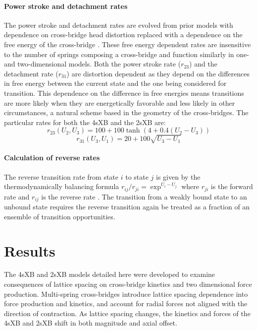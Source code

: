 \documentclass[]{article}
\begin{document}
\paragraph{Power stroke and detachment rates} %
The power stroke and detachment rates are evolved from prior models with dependence on cross-bridge head distortion replaced with a dependence on the free energy of the cross-bridge \citep{Pate1989, Tanner2007}.
These free energy dependent rates are insensitive to the number of springs composing a cross-bridge and function similarly in one- and two-dimensional models. 
Both the power stroke rate ($r_{23}$) and the detachment rate ($r_{31}$) are distortion dependent as they depend on the differences in free energy between the current state and the one being considered for transition. 
This dependence on the difference in free energies means transitions are more likely when they are energetically favorable and less likely in other circumstances, a natural scheme based in the geometry of the cross-bridges.
The particular rates for both the 4sXB and the 2sXB are: 
$$r_{23}(U_2, U_3) = 100 + 100\tanh(4 + 0.4 (U_2 - U_3)) $$
$$r_{31}(U_3, U_1) = 20 + 100 \sqrt{U_3 - U_1} $$

\paragraph{Calculation of reverse rates} %
The reverse transition rate from state $i$ to state $j$ is given by the thermodynamically balancing formula $r_{ij}/r_{ji}=\exp^{U_i-U_j}$ where $r_{ji}$ is the forward rate and $r_{ij}$ is the reverse rate \citep{Pate1989, Daniel1998, Tanner2007}.
The transition from a weakly bound state to an unbound state requires the reverse transition again be treated as a fraction of an ensemble of transition opportunities. 



\section*{Results} %

The 4sXB and 2sXB models detailed here were developed to examine consequences of lattice spacing on cross-bridge kinetics and two dimensional force production.
Multi-spring cross-bridges introduce lattice spacing dependence into force production and kinetics, and account for radial forces not aligned with the direction of contraction. 
As lattice spacing changes, the kinetics and forces of the 4sXB and 2sXB shift in both magnitude and axial offset.
\end{document}
